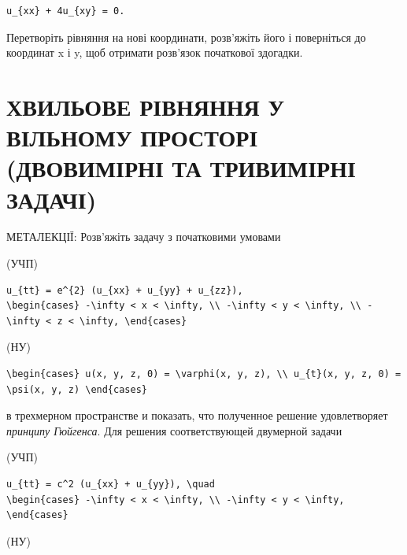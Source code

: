 \documentclass[
  ukrainian,
]{article}
\begin{document}
\begin{verbatim}
u_{xx} + 4u_{xy} = 0.
\end{verbatim}

Перетворіть рівняння на нові координати, розв'яжіть його і поверніться
до координат x і y, щоб отримати розв'язок початкової здогадки.

\section{ХВИЛЬОВЕ РІВНЯННЯ У ВІЛЬНОМУ ПРОСТОРІ (ДВОВИМІРНІ ТА ТРИВИМІРНІ
ЗАДАЧІ)}\label{ux445ux432ux438ux43bux44cux43eux432ux435-ux440ux456ux432ux43dux44fux43dux43dux44f-ux443-ux432ux456ux43bux44cux43dux43eux43cux443-ux43fux440ux43eux441ux442ux43eux440ux456-ux434ux432ux43eux432ux438ux43cux456ux440ux43dux456-ux442ux430-ux442ux440ux438ux432ux438ux43cux456ux440ux43dux456-ux437ux430ux434ux430ux447ux456}

МЕТАЛЕКЦІЇ: Розв'яжіть задачу з початковими умовами

(УЧП)

\begin{verbatim}
u_{tt} = e^{2} (u_{xx} + u_{yy} + u_{zz}),
\begin{cases} -\infty < x < \infty, \\ -\infty < y < \infty, \\ -\infty < z < \infty, \end{cases}
\end{verbatim}

(НУ)

\begin{verbatim}
\begin{cases} u(x, y, z, 0) = \varphi(x, y, z), \\ u_{t}(x, y, z, 0) = \psi(x, y, z) \end{cases}
\end{verbatim}

в трехмерном пространстве и показать, что полученное решение
удовлетворяет \emph{принципу Гюйгенса}. Для решения соответствующей
двумерной задачи

(УЧП)

\begin{verbatim}
u_{tt} = c^2 (u_{xx} + u_{yy}), \quad
\begin{cases} -\infty < x < \infty, \\ -\infty < y < \infty, \end{cases}
\end{verbatim}

(НУ)
\end{document}
